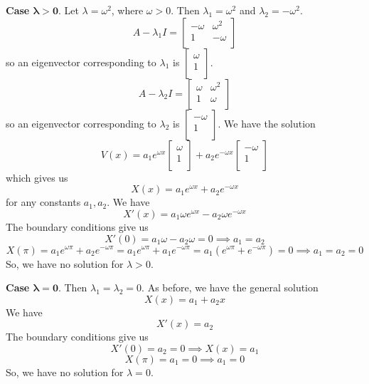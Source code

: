 \documentclass[plain]{pset}
\begin{document}
\begin{solution}
    \textbf{Case \(\mathbf{\lambda > 0}\)}. Let \(\lambda = \omega^2\), where \(\omega > 0\). Then \(\lambda_1 = \omega^2\) and \(\lambda_2 = -\omega^2\).
    \[A - \lambda_1I = \begin{bmatrix}
            -\omega & \omega^2 \\
            1       & -\omega  \\
        \end{bmatrix}\]
    so an eigenvector corresponding to \(\lambda_1\) is \(\begin{bmatrix}
        \omega \\
        1      \\
    \end{bmatrix}\).
    \[A - \lambda_2I = \begin{bmatrix}
            \omega & \omega^2 \\
            1      & \omega   \\
        \end{bmatrix}\]
    so an eigenvector corresponding to \(\lambda_2\) is \(\begin{bmatrix}
        -\omega \\
        1       \\
    \end{bmatrix}\).
    We have the solution
    \[V(x) = a_1 e^{\omega x}\begin{bmatrix}
            \omega \\
            1      \\
        \end{bmatrix} + a_2 e^{-\omega x}\begin{bmatrix}
            -\omega \\
            1       \\
        \end{bmatrix}\]
    which gives us
    \[X(x) = a_1 e^{\omega x} + a_2 e^{-\omega x}\] for any constants \(a_1, a_2\).
    We have
    \[X'(x) = a_1\omega e^{\omega x} - a_2\omega e^{-\omega x}\]
    The boundary conditions give us
    \[X'(0) = a_1\omega - a_2\omega = 0 \implies a_1 = a_2\]
    \[X(\pi) = a_1 e^{\omega\pi} + a_2 e^{-\omega\pi} = a_1 e^{\omega\pi} + a_1 e^{-\omega\pi} = a_1(e^{\omega\pi} + e^{-\omega\pi}) = 0 \implies a_1 = a_2 = 0\]
    So, we have no solution for \(\lambda > 0\).

    \textbf{Case \(\mathbf{\lambda = 0}\)}. Then \(\lambda_1 = \lambda_2 = 0\).
    As before, we have the general solution
    \[X(x) = a_1 + a_2x\]
    We have
    \[X'(x) = a_2\]
    The boundary conditions give us
    \[X'(0) = a_2 = 0 \implies X(x) = a_1\]
    \[X(\pi) = a_1 = 0 \implies a_1 = 0\]
    So, we have no solution for \(\lambda = 0\).


\end{solution}
\end{document}
